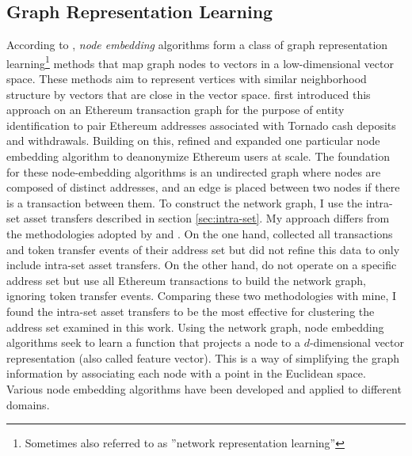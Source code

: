 \documentclass[12pt,a4paper,titlepage,oneside,english]{article}
\begin{document}
\subsection{Graph Representation Learning}
\label{sec:node}
According to \cite{Beres2020}, \textit{node embedding} algorithms form a class of graph representation learning\footnote{Sometimes also referred to as ''network representation learning''} methods that map graph nodes to vectors in a low-dimensional vector space. These methods aim to represent vertices with similar neighborhood structure by vectors that are close in the vector space. \newline
\cite{Beres2020} first introduced this approach on an Ethereum transaction graph for the purpose of entity identification to pair Ethereum addresses associated with Tornado cash deposits and withdrawals. Building on this, \cite{wu2022tutela} refined and expanded one particular node embedding algorithm to deanonymize Ethereum users at scale. \newline
The foundation for these node-embedding algorithms is an undirected graph where nodes are composed of distinct addresses, and an edge is placed between two nodes if there is a transaction between them. \newline
To construct the network graph, I use the intra-set asset transfers described in section \ref{sec:intra-set}. My approach differs from the methodologies adopted by \cite{Beres2020} and \cite{wu2022tutela}. On the one hand, \cite{Beres2020} collected all transactions and token transfer events of their address set but did not refine this data to only include intra-set asset transfers. On the other hand, \cite{wu2022tutela} do not operate on a specific address set but use all Ethereum transactions to build the network graph, ignoring token transfer events. Comparing these two methodologies with mine, I found the intra-set asset transfers to be the most effective for clustering the address set examined in this work. %
\newline
Using the network graph, node embedding algorithms seek to learn a function that projects a node to a $d$-dimensional vector representation (also called feature vector). This is a way of simplifying the graph information by associating each node with a point in the Euclidean space. Various node embedding algorithms have been developed and applied to different domains. \citep{rozemberczki2020difftovec} \newline
\end{document}
